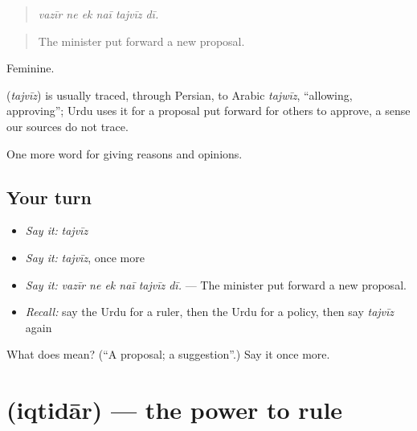 \begin{quote}
     
\end{quote}

\begin{quote}
\emph{vazīr ne ek naī tajvīz dī.}
\end{quote}

\begin{quote}
The minister put forward a new proposal.
\end{quote}

Feminine.

\begin{cousinweb}
\textbf{} (\emph{tajvīz}) is usually traced, through Persian, to Arabic \emph{tajwīz}, \textquotedblleft{}allowing, approving\textquotedblright{}; Urdu uses it for a proposal put forward for others to approve, a sense our sources do not trace.
\end{cousinweb}

\begin{grammarlens}[title={What you've built}]
One more word for giving reasons and opinions.
\end{grammarlens}

\subsection*{Your turn}
\begin{itemize}
\raggedright
  \item \emph{Say it:} \emph{tajvīz}
  \item \emph{Say it:} \emph{tajvīz}, once more
  \item \emph{Say it:} \emph{vazīr ne ek naī tajvīz dī.} — The minister put forward a new proposal.
  \item \emph{Recall:} say the Urdu for a ruler, then the Urdu for a policy, then say \emph{tajvīz} again
\end{itemize}

\begin{tcolorbox}[breakable,colback=teal!4,colframe=teal!35!black,title={Before you move on}]
What does  mean? (\textquotedblleft{}A proposal; a suggestion\textquotedblright{}.) Say it once more.
\end{tcolorbox}
\section[\texorpdfstring{\ur{اقتدار} (iqtidār)}{اقتدار (iqtidār)}]{ (iqtidār) — the power to rule}

